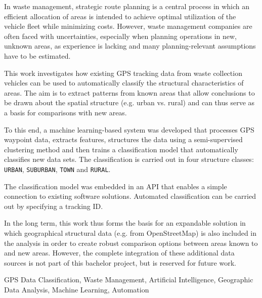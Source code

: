 \documentclass[a4paper,12pt,twoside]{scrreprt}
\begin{document}

In waste management, strategic route planning is a central
process in which an efficient allocation of areas is intended to achieve
optimal
utilization of the vehicle fleet while minimizing costs. However, waste
management companies are often faced with uncertainties, especially when
planning operations in new, unknown areas, as
experience is lacking and many planning-relevant assumptions have to be
estimated.

This work investigates how existing GPS tracking data from
waste collection vehicles can be used to automatically classify the structural
characteristics of
areas. The aim is to extract
patterns from known areas that allow conclusions to be drawn about the spatial
structure (e.g.
urban vs. rural) and can thus serve as a basis for comparisons with new
areas.

To this end, a machine learning-based system was developed that processes
GPS waypoint data, extracts features, structures the data using a
semi-supervised clustering method and then trains a
classification model that automatically classifies new data sets. The
classification is carried out in four structure classes: \texttt{URBAN},
\texttt{SUBURBAN}, \texttt{TOWN} and \texttt{RURAL}.

The classification model was embedded in an API that enables a simple
connection to existing software solutions. Automated classification can be
carried out by specifying a
tracking ID.

In the long term, this work thus forms the basis for an expandable
solution in which geographical structural data (e.g. from OpenStreetMap) is
also included in
the analysis in order to create robust comparison options between areas known
to
and new areas. However, the complete integration of these
additional data sources is not part of this bachelor project,
but is reserved for future work.
\vspace{0.5cm}

\noindent
GPS Data Classification, Waste Management, Artificial Intelligence, Geographic
Data Analysis, Machine Learning, Automation

\end{document}
